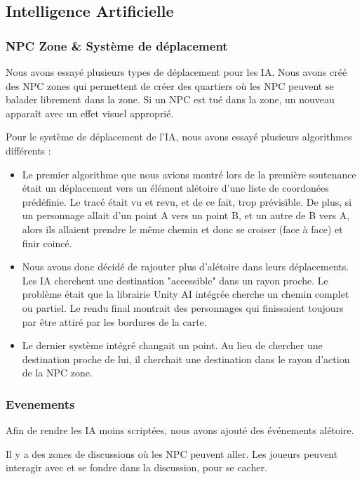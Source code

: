 \subsection{Intelligence Artificielle}
    \subsubsection{NPC Zone \& Système de déplacement}
    Nous avons essayé plusieurs types de déplacement pour les IA.
    Nous avons créé des NPC zones qui permettent de créer des quartiers
    où les NPC peuvent se balader librement dans la zone.
    Si un NPC est tué dans la zone, un nouveau apparaît avec un effet visuel approprié.

    Pour le système de déplacement de l'IA,
    nous avons essayé plusieurs algorithmes différents :\newline
    
    \begin{itemize}
        \item Le premier algorithme que nous avions montré lors de la première soutenance
        était un déplacement vers un élément alétoire d'une liste de coordonées prédéfinie.
        Le tracé était vu et revu, et de ce fait, trop prévisible.
        De plus, si un personnage allait d'un point A vers un point B, et un autre de B vers A,
        alors ils allaient prendre le même chemin et donc se croiser (face à face) et finir coincé.
        \newline
        \item  Nous avons donc décidé de rajouter plus d'alétoire dans leurs déplacements.
        Les IA cherchent une destination "accessible" dans un rayon proche.
        Le problème était que la librairie Unity AI intégrée cherche un chemin complet ou partiel.
        Le rendu final montrait des personnages qui finissaient toujours par être attiré par les bordures de la carte.
        \newline

        \item    Le dernier système intégré changait un point.
        Au lieu de chercher une destination proche de lui, il cherchait une destination dans le rayon
        d'action de la NPC zone.
    
    \end{itemize}
    
   
    
    \subsubsection{Evenements}

    Afin de rendre les IA moins scriptées, nous avons ajouté des événements alétoire.
    
    Il y a des zones de discussions où les NPC peuvent aller.
    Les joueurs peuvent interagir avec et se fondre dans la discussion, pour se cacher.


